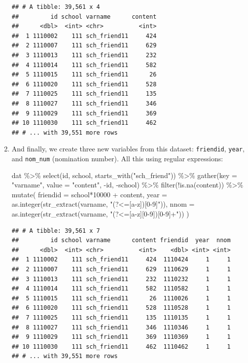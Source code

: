 \documentclass[
]{book}
\newenvironment{Shaded}{\begin{snugshade}}{\end{snugshade}}
\newcommand{\AttributeTok}[1]{\textcolor[rgb]{0.77,0.63,0.00}{#1}}
\newcommand{\DecValTok}[1]{\textcolor[rgb]{0.00,0.00,0.81}{#1}}
\newcommand{\FunctionTok}[1]{\textcolor[rgb]{0.00,0.00,0.00}{#1}}
\newcommand{\NormalTok}[1]{#1}
\newcommand{\SpecialCharTok}[1]{\textcolor[rgb]{0.00,0.00,0.00}{#1}}
\newcommand{\StringTok}[1]{\textcolor[rgb]{0.31,0.60,0.02}{#1}}
\begin{document}
\begin{enumerate}
\begin{verbatim}
## # A tibble: 39,561 x 4
##         id school varname      content
##      <dbl>  <int> <chr>          <int>
##  1 1110002    111 sch_friend11     424
##  2 1110007    111 sch_friend11     629
##  3 1110013    111 sch_friend11     232
##  4 1110014    111 sch_friend11     582
##  5 1110015    111 sch_friend11      26
##  6 1110020    111 sch_friend11     528
##  7 1110025    111 sch_friend11     135
##  8 1110027    111 sch_friend11     346
##  9 1110029    111 sch_friend11     369
## 10 1110030    111 sch_friend11     462
## # ... with 39,551 more rows
\end{verbatim}
\item
  And finally, we create three new variables from this dataset: \texttt{friendid}, \texttt{year}, and \texttt{nom\_num} (nomination number). All this using regular expressions:

\begin{Shaded}
\begin{Highlighting}[]
\NormalTok{dat }\SpecialCharTok{\%\textgreater{}\%} 
  \FunctionTok{select}\NormalTok{(id, school, }\FunctionTok{starts\_with}\NormalTok{(}\StringTok{"sch\_friend"}\NormalTok{)) }\SpecialCharTok{\%\textgreater{}\%}
  \FunctionTok{gather}\NormalTok{(}\AttributeTok{key =} \StringTok{"varname"}\NormalTok{, }\AttributeTok{value =} \StringTok{"content"}\NormalTok{, }\SpecialCharTok{{-}}\NormalTok{id, }\SpecialCharTok{{-}}\NormalTok{school) }\SpecialCharTok{\%\textgreater{}\%}
  \FunctionTok{filter}\NormalTok{(}\SpecialCharTok{!}\FunctionTok{is.na}\NormalTok{(content)) }\SpecialCharTok{\%\textgreater{}\%}
  \FunctionTok{mutate}\NormalTok{(}
    \AttributeTok{friendid =}\NormalTok{ school}\SpecialCharTok{*}\DecValTok{10000} \SpecialCharTok{+}\NormalTok{ content,}
    \AttributeTok{year     =} \FunctionTok{as.integer}\NormalTok{(}\FunctionTok{str\_extract}\NormalTok{(varname, }\StringTok{"(?\textless{}=[a{-}z])[0{-}9]"}\NormalTok{)),}
    \AttributeTok{nnom     =} \FunctionTok{as.integer}\NormalTok{(}\FunctionTok{str\_extract}\NormalTok{(varname, }\StringTok{"(?\textless{}=[a{-}z][0{-}9])[0{-}9]+"}\NormalTok{))}
\NormalTok{    )}
\end{Highlighting}
\end{Shaded}

\begin{verbatim}
## # A tibble: 39,561 x 7
##         id school varname      content friendid  year  nnom
##      <dbl>  <int> <chr>          <int>    <dbl> <int> <int>
##  1 1110002    111 sch_friend11     424  1110424     1     1
##  2 1110007    111 sch_friend11     629  1110629     1     1
##  3 1110013    111 sch_friend11     232  1110232     1     1
##  4 1110014    111 sch_friend11     582  1110582     1     1
##  5 1110015    111 sch_friend11      26  1110026     1     1
##  6 1110020    111 sch_friend11     528  1110528     1     1
##  7 1110025    111 sch_friend11     135  1110135     1     1
##  8 1110027    111 sch_friend11     346  1110346     1     1
##  9 1110029    111 sch_friend11     369  1110369     1     1
## 10 1110030    111 sch_friend11     462  1110462     1     1
## # ... with 39,551 more rows
\end{verbatim}


\end{enumerate}
\end{document}
